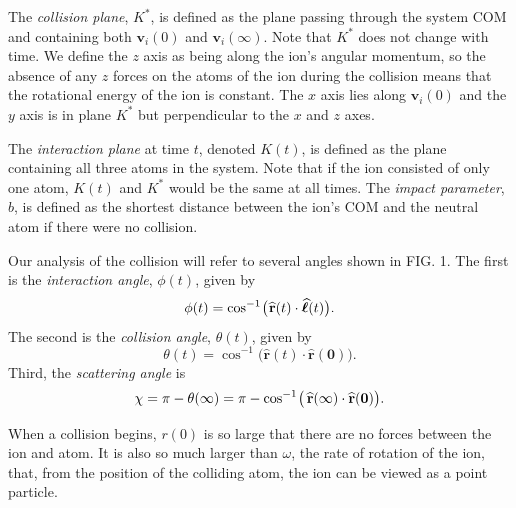 \documentclass[article]{revtex4-2}
\begin{document}
The {\em collision plane}, $K^*$, is defined as the plane passing through the system COM and containing both $\mathbf{v}_i(0)$ and $\mathbf{v}_i(\infty)$. Note that $K^*$ does not change with time. We define the $z$ axis as being along the ion's angular momentum, so the absence of any $z$ forces on the atoms of the ion during the collision means that the rotational energy of the ion is constant. The $x$ axis lies along $\mathbf{v}_i(0)$ and the $y$ axis is in plane $K^*$ but perpendicular to the $x$ and $z$ axes.

The {\em interaction plane} at time $t$, denoted $K(t)$, is defined as the plane containing all three atoms in the system. Note that if the ion consisted of only one atom, $K(t)$ and $K^*$ would be the same at all times.  The {\em impact parameter}, $b$, is defined as the shortest distance between the ion's COM and the neutral atom if there were no collision.

Our analysis of the collision will refer to several angles shown in FIG. 1. The first is the {\em interaction angle}, $\phi(t)$, given by
\begin{equation}
    \phi(t) = \cos^{-1} \mkern-2mu \big(\mkern1mu \mathbf{\widehat{r}}(t) \cdot \widehat{\boldsymbol{\ell}}(t)\big).
    \label{eqn:phi_def}
\end{equation}
The second is the {\em collision angle}, $\theta(t)$, given by
\begin{equation}
    \theta(t) = \cos^{-1} \big( \mathbf{\widehat{r}}(t) \cdot \mathbf{\mathbf{\widehat{r}}(0)}\big).
    \label{eqn:theta_def}
\end{equation}
Third, the {\em scattering angle} is
\begin{equation}
\chi = \pi - \theta(\infty) = \pi -  \cos^{-1} \mkern-2mu \big(\,
     \mathbf{\widehat{r}}(\infty) \cdot \mathbf{\widehat{r}(0)}\big).
    \label{eqn:chi_def}
\end{equation}

When a collision begins, $r(0)$ is so large that there are no forces between the ion and atom. It is also so much larger than $\omega$, the rate of rotation of the ion, that, from the position of the colliding atom, the ion can be viewed as a point particle. 
\end{document}
